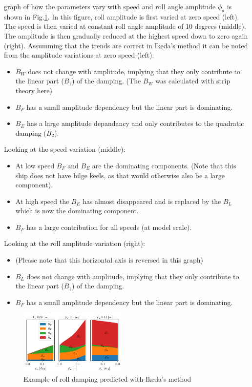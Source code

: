 graph of how the parameters vary with speed and roll angle amplitude
$\phi_a$ is shown in Fig.\ref{fig:ikeda_generic}. In this
figure, roll amplitude is first varied at zero speed (left). The speed
is then varied at constant roll angle amplitude of 10 degrees (middle).
The amplitude is then gradually reduced at the highest speed down to
zero again (right).
\quad Assumming that the trends are correct in Ikeda's method it can be
noted from the amplitude variations at zero speed (left):
\begin{itemize}
\item $B_W$ does not change with amplitude, implying that they only contribute to the linear part ($B_1$) of the damping. (The $B_W$ was calculated with strip theory here)
\item $B_F$ has a small amplitude dependency but the linear part is dominating.
\item $B_E$ has a large amplitude depandancy and only contributes to the quadratic damping ($B_2$)\citep{7505983/4AFVVGNT}.
\end{itemize}
\quad Looking at the speed variation (middle):
\begin{itemize}
\item At low speed $B_F$ and $B_E$ are the dominating components. (Note that this ship does not have bilge keels, as that would otherwise also be a large component).
\item At high speed the $B_E$ has almost disappeared and is replaced by the $B_L$ which is now the dominating component.
\item $B_F$ has a large contribution for all speeds (at model scale).
\end{itemize}
\quad Looking at the roll amplitude variation (right):
\begin{itemize}
\item (Please note that this horizontal axis is reversed in this graph)
\item $B_L$ does not change with amplitude, implying that they only contribute to the linear part ($B_1$) of the damping.
\item $B_F$ has a small amplitude dependency but the linear part is dominating.
\end{itemize}
\begin{figure}[H]
\begin{center}\includegraphics[width = 0.475\textwidth]{figures/ikeda_generic.pdf}\end{center}
\vspace{-0.7cm}
\caption{Example of roll damping predicted with Ikeda's method}
\label{fig:ikeda_generic}
\end{figure}

